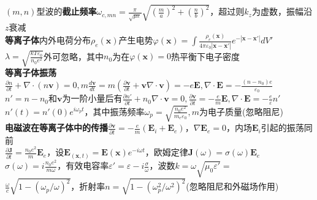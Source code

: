 \documentclass[10pt,a4paper]{article}
\begin{document}
\begin{multicols}{2}
$(m,n)$型波的\textbf{截止频率}$\omega_{c,mn}=\frac{\pi}{\sqrt{\mu\varepsilon}}\sqrt{(\frac{m}{a})^2+(\frac{n}{b})^2}$，超过则$k_z$为虚数，振幅沿$z$衰减\\
\textbf{等离子体}内外电荷分布$\rho_e(\bm{x})$产生电势$\varphi(\bm{x})=\int\frac{\rho_e(\bm{x})}{4\pi\varepsilon_0|\bm{x}-\bm{x}'|}e^{-|\bm{x}-\bm{x}'|}dV'$\\
$\lambda=\sqrt{\frac{kT\varepsilon_0}{n_0e^2}}$外可忽略，其中$n_0$为在$\varphi(\bm{x})=0$热平衡下电子密度\\
\textbf{等离子体振荡}$\frac{\partial n}{\partial t}+\nabla\cdot(n\bm{v})=0,m\frac{d\bm{v}}{dt}=m(\frac{\partial\bm{v}}{\partial t}+\bm{v}\nabla\cdot\bm{v})=-e\bm{E},\nabla\cdot\bm{E}=-\frac{(n-n_0)e}{\varepsilon_0}$\\
$n'=n-n_0$和$\bm{v}$为一阶小量后有$\frac{\partial n'}{\partial t}+n_0\nabla\cdot\bm{v}=0,\frac{\partial\bm{v}}{\partial t}=-\frac{e}{m}\bm{E},\nabla\cdot\bm{E}=-\frac{e}{\varepsilon}n'$\\
\indent$n'(t)=n'(0)e^{i\omega_pt}$，其中振荡频率$\omega_p=\sqrt{\frac{n_0e^2}{m_e\varepsilon_0}},m$为电子质量(忽略阻尼)\\
\textbf{电磁波在等离子体中的传播}$\frac{\partial\bm{v}}{\partial t}=-\frac{e}{m}(\bm{E}_i+\bm{E}_e)$，$\nabla\bm{E}_e=0$\scriptsize，内场$\bm{E}_i$引起的振荡同前\\
$\frac{\partial\bm{J}}{\partial t}=\frac{n_0e^2}{m}\bm{E}_e$，设$\bm{E}_(\bm{x},t)=\bm{E}(\bm{x})e^{-i\omega t}$，欧姆定律$\bm{J}(\omega)=\sigma(\omega)\bm{E}_e$\\
$\sigma(\omega)=i\frac{n_0e^2}{m\omega}$，有效电容率$\varepsilon'=\varepsilon-i\frac{\sigma}{\omega}$，波数$k=\omega\sqrt{\mu_0\varepsilon'}=$\\
\indent$\frac{\omega}{c}\sqrt{1-(\omega_p/\omega)^2}$，折射率$n=\sqrt{1-(\omega_p^2/\omega^2)^2}$(忽略阻尼和外磁场作用)
\end{multicols}
\end{document}
